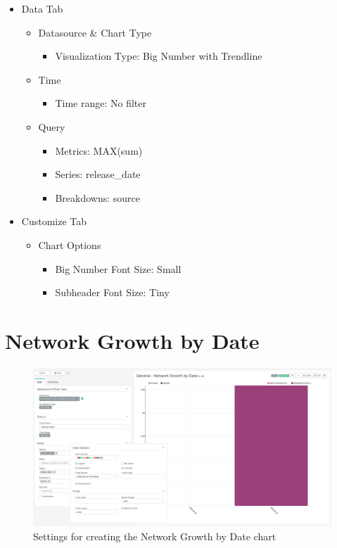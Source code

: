 \documentclass[
]{book}
\providecommand{\tightlist}{%
  \setlength{\itemsep}{0pt}\setlength{\parskip}{0pt}}
\begin{document}
\begin{itemize}
\item
  Data Tab

  \begin{itemize}
  \item
    Datasource \& Chart Type

    \begin{itemize}
    \tightlist
    \item
      Visualization Type: Big Number with Trendline
    \end{itemize}
  \item
    Time

    \begin{itemize}
    \tightlist
    \item
      Time range: No filter
    \end{itemize}
  \item
    Query

    \begin{itemize}
    \item
      Metrics: MAX(sum)
    \item
      Series: release\_date
    \item
      Breakdowns: source
    \end{itemize}
  \end{itemize}
\item
  Customize Tab

  \begin{itemize}
  \item
    Chart Options

    \begin{itemize}
    \item
      Big Number Font Size: Small
    \item
      Subheader Font Size: Tiny
    \end{itemize}
  \end{itemize}
\end{itemize}

\hypertarget{network-growth-by-date}{%
\section{Network Growth by Date}\label{network-growth-by-date}}

\begin{figure}
\includegraphics[width=1\linewidth]{images/03-general/03-network_growth_by_date} \caption{Settings for creating the Network Growth by Date chart}\label{fig:networkGrowthByDate}
\end{figure}
\end{document}
